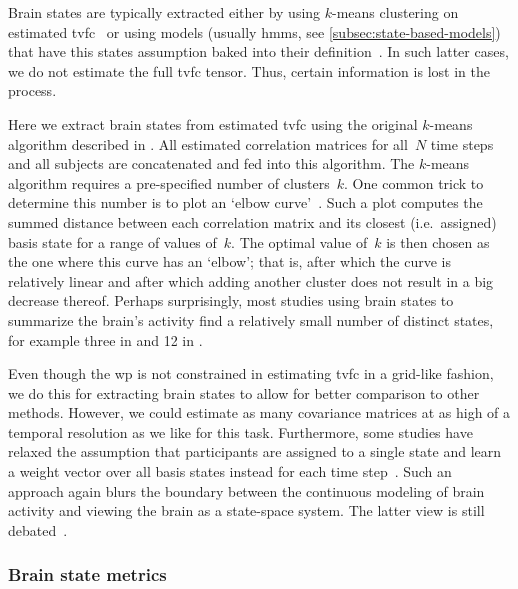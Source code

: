 Brain states are typically extracted either by using $k$-means clustering on estimated \gls{tvfc}~\parencite[see e.g.][]{Allen2014, Abrol2016, Zhi2018, Hakimdavoodi2020} or using models (usually \glspl{hmm}, see \cref{subsec:state-based-models}) that have this states assumption baked into their definition~\parencite{Lurie2020}.
In such latter cases, we do not estimate the full \gls{tvfc} tensor.
Thus, certain information is lost in the process.

Here we extract brain states from estimated \gls{tvfc} using the original $k$-means algorithm described in \textcite{Lloyd1982}.
All estimated correlation matrices for all~$N$ time steps and all subjects are concatenated and fed into this algorithm.
The $k$-means algorithm requires a pre-specified number of clusters~$k$.
One common trick to determine this number is to plot an `elbow curve'~\parencite[see e.g.][chapter 5.5]{Everitt2011}.
Such a plot computes the summed distance between each correlation matrix and its closest (i.e.~assigned) basis state for a range of values of~$k$.
The optimal value of~$k$ is then chosen as the one where this curve has an `elbow'; that is, after which the curve is relatively linear and after which adding another cluster does not result in a big decrease thereof.
%
Perhaps surprisingly, most studies using brain states to summarize the brain's activity find a relatively small number of distinct states, for example three in \textcite{Choe2017, Dini2021} and 12 in \textcite{Vidaurre2017}.

Even though the \gls{wp} is not constrained in estimating \gls{tvfc} in a grid-like fashion, we do this for extracting brain states to allow for better comparison to other methods.
However, we could estimate as many covariance matrices at as high of a temporal resolution as we like for this task.
%
Furthermore, some studies have relaxed the assumption that participants are assigned to a single state and learn a weight vector over all basis states instead for each time step~\parencite{Leonardi2014}.
Such an approach again blurs the boundary between the continuous modeling of brain activity and viewing the brain as a state-space system.
The latter view is still debated~\parencite[see][for an excellent discussion on the potential and shortcomings of the brain states framework]{Keilholz2017}.

\subsubsection{Brain state metrics}

